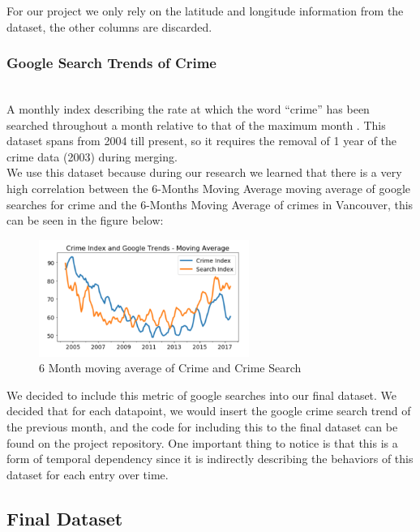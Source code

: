\documentclass[conference]{IEEEtran}
\begin{document}
For our project we only rely on the latitude and longitude information from the dataset, the other columns are discarded.\\

\subsubsection{Google Search Trends of Crime}

~\\A monthly index describing the rate at which the word “crime” has been searched throughout a month relative
to that of the maximum month \cite{Google}. This dataset spans from 2004 till present, so it requires the removal of 1 year
of the crime data (2003) during merging.\\

We use this dataset because during our research we learned that there is a very high
correlation between the 6-Months Moving Average moving average of google searches for crime and the
6-Months Moving Average of crimes in Vancouver, this can be seen in the figure below:

\begin{figure}[H]
  \centering
  \captionsetup{justification=centering}
  \centering
  \includegraphics[width=2.7in]{3.png}
  \caption{ 6 Month moving average of Crime and Crime Search}  
  \label{3}
\end{figure}

We decided to include this metric of google searches into our final dataset. We decided that for each datapoint, we would insert the google crime search trend of the previous month,
and the code for including this to the final dataset can be found on the project repository. \cite{Trend_Script}
One important thing to notice is that this is a form of temporal dependency since it is indirectly describing the behaviors of
this dataset for each entry over time.

\subsection{Final Dataset}
\end{document}
